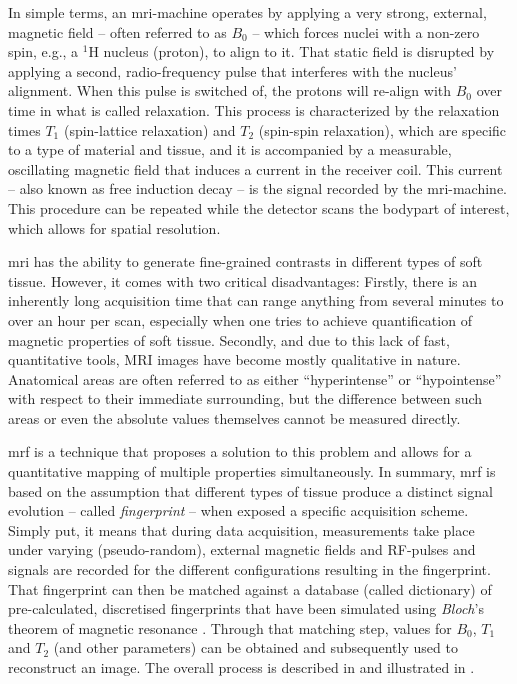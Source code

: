 In simple terms, an \acrshort{mri}-machine operates by applying a very strong, external, magnetic field -- often referred to as $B_0$ -- which forces nuclei with a non-zero spin, e.g., a $^{1}\text{H}$ nucleus (proton), to align to it. That static field is disrupted by applying a second, radio-frequency pulse that interferes with the nucleus' alignment. When this pulse is switched of, the protons will re-align with $B_0$ over time in what is called relaxation. This process is characterized by the relaxation times $T_1$ (spin-lattice relaxation) and $T_2$ (spin-spin relaxation), which are specific to a type of material and tissue, and it is accompanied by a measurable, oscillating magnetic field that induces a current in the receiver coil. This current -- also known as free induction decay -- is the signal recorded by the \acrshort{mri}-machine. This procedure can be repeated while the detector scans the bodypart of interest, which allows for spatial resolution.

\acrshort{mri} has the ability to generate fine-grained contrasts in different types of soft tissue. However, it comes with two critical disadvantages: Firstly, there is an inherently long acquisition time that can range anything from several minutes to over an hour per scan, especially when one tries to achieve quantification of magnetic properties of soft tissue. Secondly, and due to this lack of fast, quantitative tools, MRI images have become mostly qualitative in nature. Anatomical areas are often referred to as either ``hyperintense'' or ``hypointense'' with respect to their immediate surrounding, but the difference between such areas or even the absolute values themselves cannot be measured directly.

\acrfull{mrf} is a technique \cite{Ma:2013Magnetic} that proposes a solution to this problem and allows for a quantitative mapping of multiple properties simultaneously. In summary, \acrshort{mrf} is based on the assumption that different types of tissue produce a distinct signal evolution -- called \emph{fingerprint} -- when exposed a specific acquisition scheme. Simply put, it means that during data acquisition, measurements take place under varying (pseudo-random), external magnetic fields and RF-pulses and signals are recorded for the different configurations resulting in the fingerprint. That fingerprint can then be matched against a database (called dictionary) of pre-calculated, discretised fingerprints that have been simulated using \emph{Bloch}'s theorem of magnetic resonance \cite{Bloch:1946Nuclear}. Through that matching step, values for $B_0$, $T_1$ and $T_2$ (and other parameters) can be obtained and subsequently used to reconstruct an image. The overall process is described in \cite{Bipin:2019Magnetic} and illustrated in .

